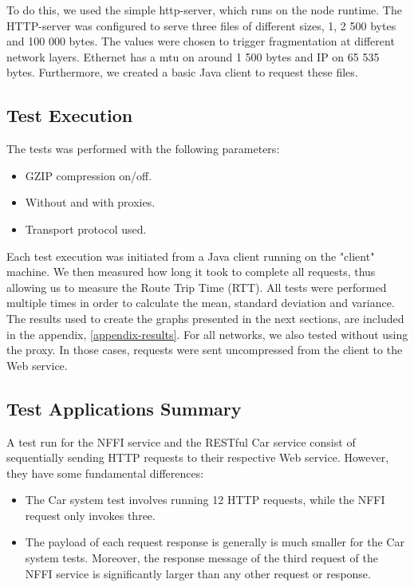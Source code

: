 To do this, we used the simple http-server\cite{http-server-homepage},
which runs on the node runtime. The HTTP-server was configured to serve
 three files of different sizes, 1, 2 500 bytes and 100 000 bytes.
 The values were chosen to trigger fragmentation at different network layers.
 Ethernet has a \gls{mtu} on around 1 500 bytes and IP on 65 535 bytes.
 Furthermore, we created a basic Java client to request these files.

\subsection{Test Execution}

The tests was performed with the following parameters:

\begin{itemize}
	\item GZIP compression on/off.
	\item Without and with proxies.
    \item Transport protocol used.
\end{itemize}

Each test execution was initiated from a Java client running on the "client"
machine. We then measured how long it took to complete all requests, thus
allowing us to measure the Route Trip Time (RTT). All tests were performed
multiple times in order to calculate the mean, standard deviation and variance.
The results used to create the graphs presented in the next sections, are
included in the appendix, \cref{appendix-results}. For all networks, we also
tested without using the proxy. In those cases, requests were sent uncompressed
from the client to the Web service.


\subsection{Test Applications Summary}

A test run for the NFFI service and the RESTful Car service consist of
sequentially sending HTTP requests to their respective Web service. However,
they have some fundamental differences:

\begin{itemize}

     \item The Car system test involves running 12 HTTP requests, while the NFFI
     request only invokes three.

    \item The payload of each request response is generally is much smaller for
    the Car system tests. Moreover, the response message of the third request of the NFFI
    service is significantly larger than any other request or response.

\end{itemize}

